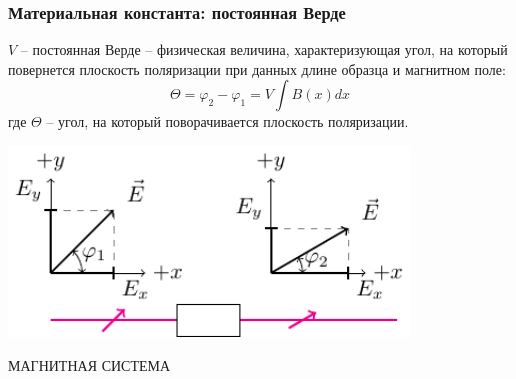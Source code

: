 \documentclass[10pt,pdf,hyperref={unicode}, dvipsnames, handout]{beamer}
\begin{document}
\begin{frame}
	\frametitle{Материальная константа: постоянная Верде}
	$V$ -- постоянная Верде -- физическая величина, характеризующая угол, на который повернется плоскость поляризации при данных длине образца и магнитном поле:
	\begin{equation}
		\Theta=\varphi_2-\varphi_1=V \int B(x)dx
	\end{equation}
	где $\Theta$ -- угол, на который поворачивается плоскость поляризации.
	\begin{center}
		\includegraphics[width=0.8\textwidth]{img/rotpol}
	\end{center}
	МАГНИТНАЯ СИСТЕМА
\end{frame}
\end{document}
